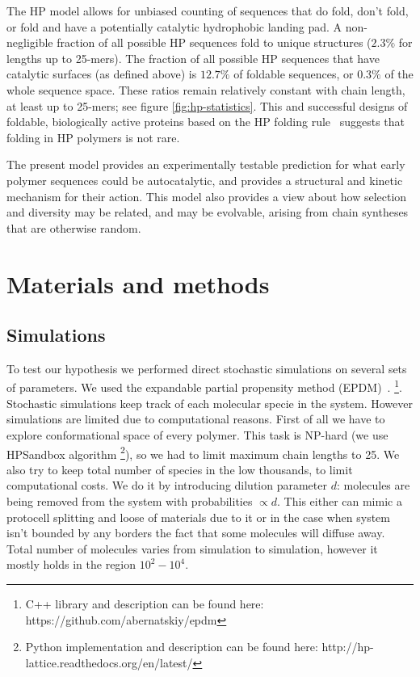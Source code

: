 \documentclass[journal=jacsat,manuscript=article,layout=twocolumn]{achemso}
\begin{document}
 The HP model allows for unbiased counting of sequences that do fold, don't fold, or fold and have 
a potentially catalytic hydrophobic landing pad.  A non-negligible fraction of all possible HP 
sequences fold to unique structures ($2.3\% $ for lengths up to 25-mers). The fraction of all 
possible HP sequences that have catalytic surfaces (as defined above) is $12.7\%$ of foldable 
sequences, or $0.3\%$ of the whole sequence space.  These ratios remain relatively constant with 
chain length, at least up to 25-mers; see figure \ref{fig:hp-statistics}.  This and successful 
designs of foldable, biologically active proteins based on the HP folding rule~\cite{Murphy2015} 
suggests that folding in HP polymers is not rare.  
 
  The present model provides an experimentally testable prediction for what early 
  polymer sequences could be autocatalytic, and provides a structural and kinetic mechanism for 
their action.  This model also provides a view about how selection and diversity may be related, 
and may be evolvable, arising from chain syntheses that are otherwise random.



\section{Materials and methods}\label{sec:mat}
\subsection{Simulations}\label{sec:mat-sim}
To test our hypothesis we performed direct stochastic simulations on several sets of parameters. 
We 
used the expandable partial propensity method (EPDM)~\cite{Guseva2016b}.
\footnote{C++ library and description can be found here: https://github.com/abernatskiy/epdm}. 
Stochastic simulations keep track of each 
molecular specie in the system. However simulations are limited due to computational reasons. 
First of all we have to explore conformational space of every polymer. This task is NP-hard (we 
use 
HPSandbox algorithm\cite{lau1989lattice,Dill2008} \footnote{Python implementation and description 
can be found here: http://hp-lattice.readthedocs.org/en/latest/}), so we had to limit 
maximum chain lengths to 25. We also try to keep total number of species in the low thousands, to 
limit computational costs. We do it by introducing dilution parameter $d$: molecules are being 
removed from the system with probabilities $\propto d$. 
This either can mimic a protocell splitting and loose of materials due to it or in the case when 
system isn't bounded by any borders the fact that some molecules will diffuse away. Total number 
of 
molecules varies from simulation to simulation, 
however it mostly holds in the region $10^2-10^4$.
\end{document}
